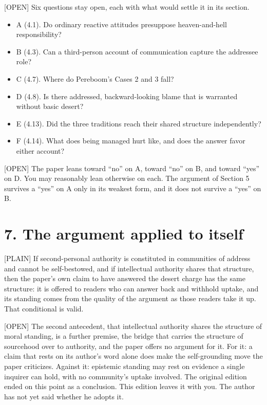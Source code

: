 \documentclass[11pt]{article}
\newcommand{\register}[1]{{\ttfamily\small #1}}
\begin{document}
\register{[OPEN]} Six questions stay open, each with what would settle it in its section.

\begin{itemize}
\item A (4.1). Do ordinary reactive attitudes presuppose heaven-and-hell responsibility?
\item B (4.3). Can a third-person account of communication capture the addressee role?
\item C (4.7). Where do Pereboom's Cases 2 and 3 fall?
\item D (4.8). Is there addressed, backward-looking blame that is warranted without basic desert?
\item E (4.13). Did the three traditions reach their shared structure independently?
\item F (4.14). What does being managed hurt like, and does the answer favor either account?
\end{itemize}
\register{[OPEN]} The paper leans toward ``no'' on A, toward ``no'' on B, and toward ``yes'' on D. You may reasonably lean otherwise on each. The argument of Section 5 survives a ``yes'' on A only in its weakest form, and it does not survive a ``yes'' on B.

\section*{7. The argument applied to itself}

\register{[PLAIN]} If second-personal authority is constituted in communities of address and cannot be self-bestowed, and if intellectual authority shares that structure, then the paper's own claim to have answered the desert charge has the same structure: it is offered to readers who can answer back and withhold uptake, and its standing comes from the quality of the argument as those readers take it up. That conditional is valid.

\register{[OPEN]} The second antecedent, that intellectual authority shares the structure of moral standing, is a further premise, the bridge that carries the structure of sourcehood over to authority, and the paper offers no argument for it. For it: a claim that rests on its author's word alone does make the self-grounding move the paper criticizes. Against it: epistemic standing may rest on evidence a single inquirer can hold, with no community's uptake involved. The original edition ended on this point as a conclusion. This edition leaves it with you. The author has not yet said whether he adopts it.
\end{document}
